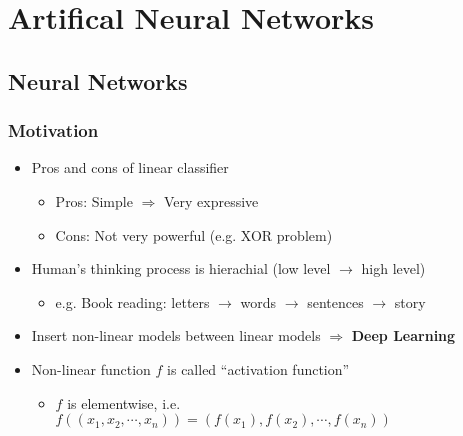 \section{Artifical Neural Networks}

\subsection{Neural Networks}

\subsubsection*{Motivation}
\begin{itemize}
    \item Pros and cons of linear classifier
    \begin{itemize}
        \item Pros: Simple $\Rightarrow$ Very expressive
        \item Cons: Not very powerful (e.g. XOR problem)
    \end{itemize}
    \item Human's thinking process is hierachial (low level $\rightarrow$ high level)
    \begin{itemize}
        \item e.g. Book reading: letters $\rightarrow$ words $\rightarrow$ sentences $\rightarrow$ story
    \end{itemize}
    \item Insert non-linear models between linear models $\Rightarrow$ \textbf{Deep Learning}
    \item Non-linear function $f$ is called ``activation function''
    \begin{itemize}
        \item $f$ is elementwise, i.e. $f\left((x_1,x_2,\cdots,x_n)\right)=(f(x_1),f(x_2),\cdots,f(x_n))$
    \end{itemize}
\end{itemize}
\begin{figures}
\end{figures}


